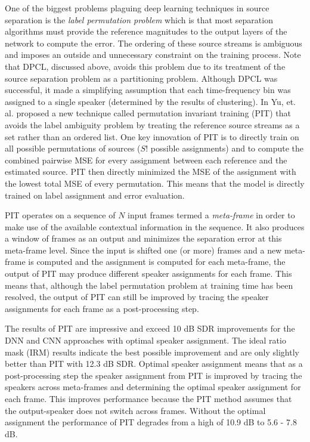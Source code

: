 \documentclass[journal, a4paper]{IEEEtran}
\begin{document}
One of the biggest problems plaguing deep learning techniques in source separation is the \textit{label permutation problem} which is that most separation algorithms must provide the reference magnitudes to the output layers of the network to compute the error. The ordering of these source streams is ambiguous and imposes an outside and unnecessary constraint on the training process. Note that DPCL, discussed above, avoids this problem due to its treatment of the source separation problem as a partitioning problem. Although DPCL was successful, it made a simplifying assumption that each time-frequency bin was assigned to a single speaker (determined by the results of clustering). In \cite{DBLP:journals/corr/YuKTJ16} Yu, et. al. proposed a new technique called permutation invariant training (PIT) that avoids the label ambiguity problem by treating the reference source streams as a set rather than an ordered list. One key innovation of PIT is to directly train on all possible permutations of sources ($S!$ possible assignments) and to compute the combined pairwise MSE for every assignment between each reference and the estimated source. PIT then directly minimized the MSE of the assignment with the lowest total MSE of every permutation. This means that the model is directly trained on label assignment and error evaluation.

PIT operates on a sequence of $N$ input frames termed a \textit{meta-frame} in order to make use of the available contextual information in the sequence. It also produces a window of frames as an output and minimizes the separation error at this meta-frame level. Since the input is shifted one (or more) frames and a new meta-frame is computed and the assignment is computed for each meta-frame, the output of PIT may produce different speaker assignments for each frame. This means that, although the label permutation problem at training time has been resolved, the output of PIT can still be improved by tracing the speaker assignments for each frame as a post-processing step.

The results of PIT are impressive and exceed 10 dB SDR improvements for the DNN and CNN approaches with optimal speaker assignment. The ideal ratio mask (IRM) results indicate the best possible improvement and are only slightly better than PIT with 12.3 dB SDR. Optimal speaker assignment means that as a post-processing step the speaker assignment from PIT is improved by tracing the speakers across meta-frames and determining the optimal speaker assignment for each frame. This improves performance because the PIT method assumes that the output-speaker does not switch across frames. Without the optimal assignment the performance of PIT degrades from a high of 10.9 dB to 5.6 - 7.8 dB.
\end{document}
